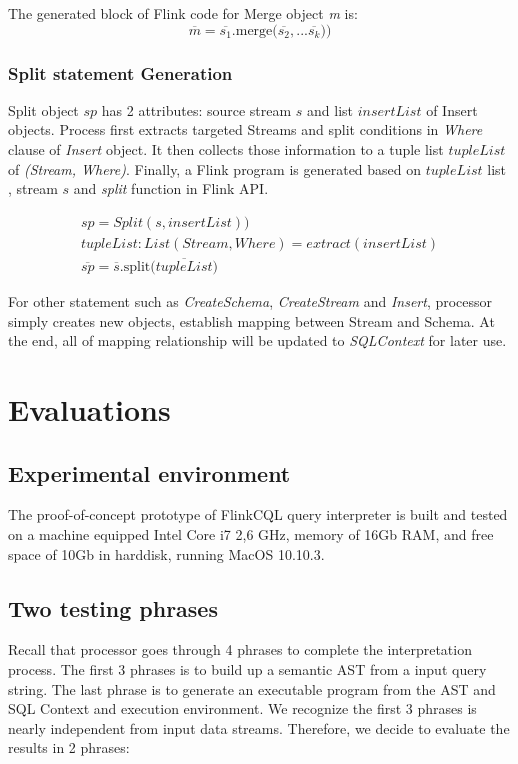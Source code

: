 The generated block of Flink code for Merge object \textit{m} is:
\begin{equation}
	\overline{m} = \overline{s_1}\textrm{.merge(}\overline{s_2}, ...\overline{s_k} \textrm{))}
\end{equation}

\subsubsection*{Split statement Generation}

Split object $sp$ has 2 attributes: source stream $s$ and list $insertList$ of Insert objects. Process first extracts targeted Streams and split conditions in \textit{Where} clause  of \textit{Insert} object. It then collects those information to a tuple list $tupleList$ of \textit{(Stream, Where)}. Finally, a Flink program is generated based on $tupleList$ list ,  stream $s$ and \textit{split} function in Flink API.

\begin{align}
	sp = Split(s, insertList)) \\
	tupleList: List(Stream, Where) = extract(insertList) \\
	\overline{sp} = \overline{s}\textrm{.split(}\overline{tupleList})
\end{align}

For other statement such as \textit{CreateSchema}, \textit{CreateStream} and \textit{Insert}, processor simply creates new objects, establish mapping between Stream and Schema. At the end, all of mapping relationship will be updated to \textit{SQLContext} for later use.

\section{Evaluations}
\subsection*{Experimental environment}
The proof-of-concept prototype of FlinkCQL query interpreter is built and tested on a machine equipped Intel Core i7 2,6 GHz, memory of 16Gb RAM, and free space of 10Gb in harddisk, running MacOS 10.10.3.

\subsection{Two testing phrases}
Recall that processor goes through 4 phrases to complete the interpretation process. The first 3 phrases is to build up a semantic AST from a input query string. The last phrase is to generate an executable program from the AST and SQL Context and execution environment. We recognize the first 3 phrases is nearly independent from input data streams.  Therefore, we decide to evaluate the results in 2 phrases:

